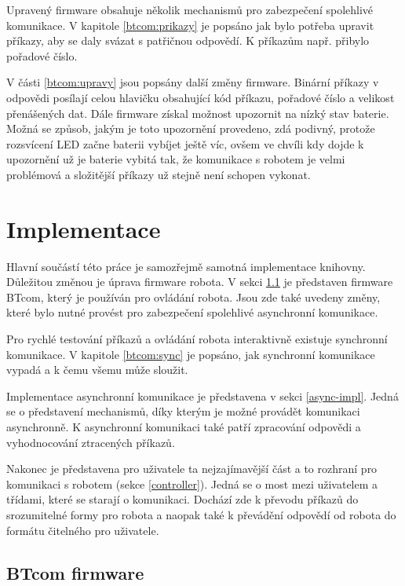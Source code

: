 \documentclass[12pt,notitlepage]{report}
\begin{document}
    Upravený firmware obsahuje několik mechanismů pro zabezpečení spolehlivé
    komunikace. V kapitole \ref{btcom:prikazy} je popsáno jak bylo potřeba
    upravit příkazy, aby se daly svázat s patřičnou odpovědí. K příkazům např.
    přibylo pořadové číslo.

    V části \ref{btcom:upravy} jsou popsány další změny firmware. Binární
    příkazy v odpovědi posílají celou hlavičku obsahující kód příkazu, pořadové
    číslo a velikost přenášených dat. Dále firmware získal možnost upozornit na
    nízký stav baterie. Možná se způsob, jakým je toto upozornění provedeno,
    zdá podivný, protože rozsvícení LED začne baterii vybíjet ještě víc, ovšem
    ve chvíli kdy dojde k upozornění už je baterie vybitá tak, že komunikace s
    robotem je velmi problémová a složitější příkazy už stejně není schopen
    vykonat.

\chapter{Implementace} %
\label{Implementace}

    Hlavní součástí této práce je samozřejmě samotná implementace knihovny.
    Důležitou změnou je úprava firmware robota. V sekci \ref{btcom} je
    představen firmware BTcom, který je používán pro ovládání robota. Jsou zde
    také uvedeny změny, které bylo nutné provést pro zabezpečení spolehlivé
    asynchronní komunikace.

    Pro rychlé testování příkazů a ovládání robota interaktivně existuje
    synchronní komunikace. V kapitole \ref{btcom:sync} je popsáno, jak
    synchronní komunikace vypadá a k čemu všemu může sloužit.

    Implementace asynchronní komunikace je představena v sekci
    \ref{async-impl}. Jedná se o představení mechanismů, díky kterým je možné
    provádět komunikaci asynchronně. K asynchronní komunikaci také patří
    zpracování odpovědi a vyhodnocování ztracených příkazů.

    Nakonec je představena pro uživatele ta nejzajímavější část a to rozhraní
    pro komunikaci s robotem (sekce \ref{controller}). Jedná se o most mezi
    uživatelem a třídami, které se starají o komunikaci. Dochází zde k převodu
    příkazů do srozumitelné formy pro robota a naopak také k převádění odpovědí
    od robota do formátu čitelného pro uživatele.

    \section{BTcom firmware}
    \label{btcom}
\end{document}
